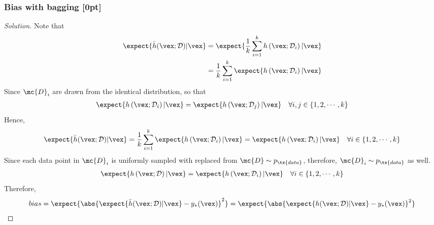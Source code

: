 \documentclass{article}
\begin{document}
	\subsubsection{Bias with bagging [0pt]}
	\begin{proof}[Solution]
		Note that
		\begin{align}
			\expect{
				\bar{h}(\vex ; \mathcal{D})|\vex}
			&= \expect{
			\frac{1}{k} \sum_{i=1}^{k}
			h\left(\vex ; \mathcal{D}_{i}\right)
			| \vex} \\
			&= \frac{1}{k}
			\sum_{i=1}^{k}
			\expect{
			h\left(\vex ; \mathcal{D}_{i}\right)
			| \vex}
		\end{align}
		Since $\mc{D}_i$ are drawn from the identical distribution, so that
		\begin{align}
			\expect{
			h\left(\vex ; \mathcal{D}_{i}\right)
			| \vex} = 
			\expect{
			h\left(\vex ; \mathcal{D}_{j}\right)
			| \vex}\quad \forall i, j \in \{1, 2, \cdots, k\}
		\end{align}
		Hence,
		\begin{align}
			\expect{
				\bar{h}(\vex ; \mathcal{D})|\vex}
			= \frac{1}{k}
			\sum_{i=1}^{k}
			\expect{
			h\left(\vex ; \mathcal{D}_{i}\right)
			| \vex}
			= \expect{
			h\left(\vex ; \mathcal{D}_{i}\right)
			| \vex}\quad \forall i \in \{1, 2, \cdots, k\}
		\end{align}
		Since each data point in $\mc{D}_i$ is uniformly sampled with replaced from $\mc{D} \sim p_\tx{data}$, therefore, $\mc{D}_i \sim p_\tx{data}$ as well.
		\begin{align}
			\expect{
			h\left(\vex ; \mathcal{D}\right)
			| \vex}
			= 
			\expect{
			h\left(\vex ; \mathcal{D}_{i}\right)
			| \vex}\quad \forall i \in \{1, 2, \cdots, k\}
		\end{align}
		Therefore,
		\begin{align}
			bias = \expect{
			\abs{
			\expect{
				\bar{h}(\vex ; \mathcal{D})|\vex}
			- y_*(\vex)
			}^2
			}
			= \expect{
			\abs{
			\expect{
				h(\vex ; \mathcal{D})|\vex}
			- y_*(\vex)
			}^2
			}
		\end{align}
	\end{proof}
	
\end{document}
